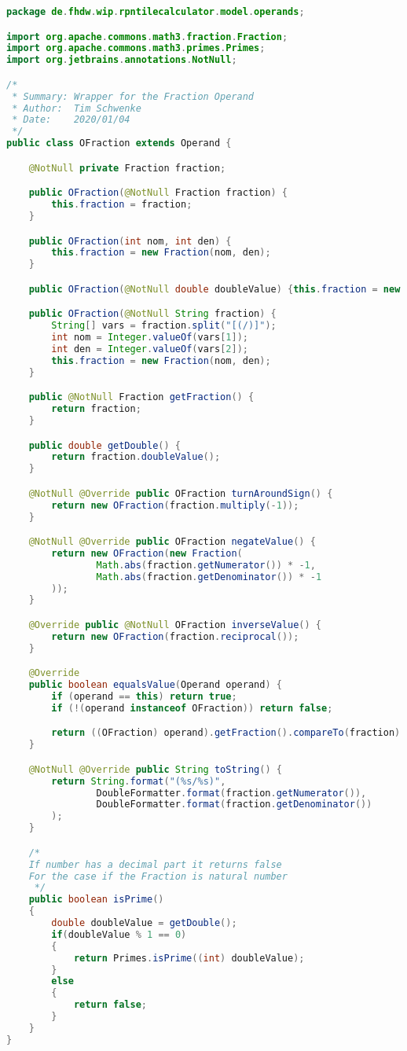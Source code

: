 \begin{lstlisting}[caption=OFraction (Schwenke),label=list:OFraction,language=Java]
package de.fhdw.wip.rpntilecalculator.model.operands;

import org.apache.commons.math3.fraction.Fraction;
import org.apache.commons.math3.primes.Primes;
import org.jetbrains.annotations.NotNull;

/*
 * Summary: Wrapper for the Fraction Operand
 * Author:  Tim Schwenke
 * Date:    2020/01/04
 */
public class OFraction extends Operand {

    @NotNull private Fraction fraction;

    public OFraction(@NotNull Fraction fraction) {
        this.fraction = fraction;
    }

    public OFraction(int nom, int den) {
        this.fraction = new Fraction(nom, den);
    }

    public OFraction(@NotNull double doubleValue) {this.fraction = new Fraction(doubleValue); }

    public OFraction(@NotNull String fraction) {
        String[] vars = fraction.split("[(/)]");
        int nom = Integer.valueOf(vars[1]);
        int den = Integer.valueOf(vars[2]);
        this.fraction = new Fraction(nom, den);
    }

    public @NotNull Fraction getFraction() {
        return fraction;
    }

    public double getDouble() {
        return fraction.doubleValue();
    }

    @NotNull @Override public OFraction turnAroundSign() {
        return new OFraction(fraction.multiply(-1));
    }

    @NotNull @Override public OFraction negateValue() {
        return new OFraction(new Fraction(
                Math.abs(fraction.getNumerator()) * -1,
                Math.abs(fraction.getDenominator()) * -1
        ));
    }

    @Override public @NotNull OFraction inverseValue() {
        return new OFraction(fraction.reciprocal());
    }

    @Override
    public boolean equalsValue(Operand operand) {
        if (operand == this) return true;
        if (!(operand instanceof OFraction)) return false;

        return ((OFraction) operand).getFraction().compareTo(fraction) == 0;
    }

    @NotNull @Override public String toString() {
        return String.format("(%s/%s)",
                DoubleFormatter.format(fraction.getNumerator()),
                DoubleFormatter.format(fraction.getDenominator())
        );
    }

    /*
    If number has a decimal part it returns false
    For the case if the Fraction is natural number
     */
    public boolean isPrime()
    {
        double doubleValue = getDouble();
        if(doubleValue % 1 == 0)
        {
            return Primes.isPrime((int) doubleValue);
        }
        else
        {
            return false;
        }
    }
}
\end{lstlisting}    

